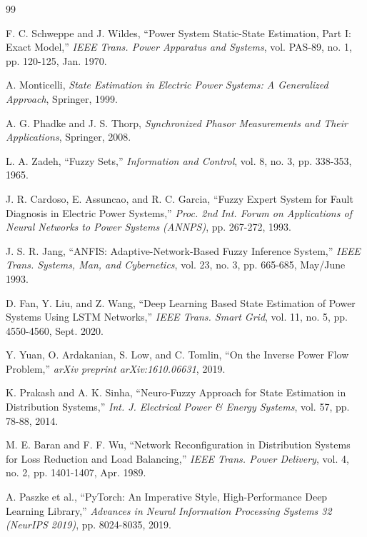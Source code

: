\documentclass[12pt,a4paper]{report}
\begin{document}
\begin{thebibliography}{99}

F. C. Schweppe and J. Wildes,
``Power System Static-State Estimation, Part I: Exact Model,''
\textit{IEEE Trans. Power Apparatus and Systems},
vol. PAS-89, no. 1, pp. 120-125, Jan. 1970.

A. Monticelli,
\textit{State Estimation in Electric Power Systems: A Generalized Approach},
Springer, 1999.

A. G. Phadke and J. S. Thorp,
\textit{Synchronized Phasor Measurements and Their Applications},
Springer, 2008.

L. A. Zadeh,
``Fuzzy Sets,''
\textit{Information and Control},
vol. 8, no. 3, pp. 338-353, 1965.

J. R. Cardoso, E. Assuncao, and R. C. Garcia,
``Fuzzy Expert System for Fault Diagnosis in Electric Power Systems,''
\textit{Proc. 2nd Int. Forum on Applications of Neural Networks to Power Systems (ANNPS)},
pp. 267-272, 1993.

J. S. R. Jang,
``ANFIS: Adaptive-Network-Based Fuzzy Inference System,''
\textit{IEEE Trans. Systems, Man, and Cybernetics},
vol. 23, no. 3, pp. 665-685, May/June 1993.

D. Fan, Y. Liu, and Z. Wang,
``Deep Learning Based State Estimation of Power Systems Using LSTM Networks,''
\textit{IEEE Trans. Smart Grid},
vol. 11, no. 5, pp. 4550-4560, Sept. 2020.

Y. Yuan, O. Ardakanian, S. Low, and C. Tomlin,
``On the Inverse Power Flow Problem,''
\textit{arXiv preprint arXiv:1610.06631}, 2019.

K. Prakash and A. K. Sinha,
``Neuro-Fuzzy Approach for State Estimation in Distribution Systems,''
\textit{Int. J. Electrical Power \& Energy Systems},
vol. 57, pp. 78-88, 2014.

M. E. Baran and F. F. Wu,
``Network Reconfiguration in Distribution Systems for Loss Reduction and Load Balancing,''
\textit{IEEE Trans. Power Delivery},
vol. 4, no. 2, pp. 1401-1407, Apr. 1989.

A. Paszke et al.,
``PyTorch: An Imperative Style, High-Performance Deep Learning Library,''
\textit{Advances in Neural Information Processing Systems 32 (NeurIPS 2019)},
pp. 8024-8035, 2019.


\end{thebibliography}
\end{document}
